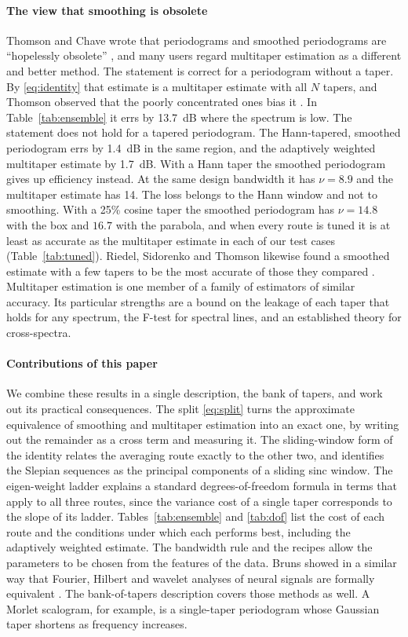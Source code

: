 \documentclass[10pt,twocolumn]{article}
\begin{document}
\paragraph{The view that smoothing is obsolete} Thomson and Chave wrote that periodograms and smoothed periodograms are ``hopelessly obsolete'' \cite{thomson1991}, and many users regard multitaper estimation as a different and better method. The statement is correct for a periodogram without a taper. By \eqref{eq:identity} that estimate is a multitaper estimate with all $N$ tapers, and Thomson observed that the poorly concentrated ones bias it \cite{thomson1982}. In Table~\ref{tab:ensemble} it errs by 13.7~dB where the spectrum is low. The statement does not hold for a tapered periodogram. The Hann-tapered, smoothed periodogram errs by 1.4~dB in the same region, and the adaptively weighted multitaper estimate by 1.7~dB. With a Hann taper the smoothed periodogram gives up efficiency instead. At the same design bandwidth it has $\nu=8.9$ and the multitaper estimate has 14. The loss belongs to the Hann window and not to smoothing. With a 25\% cosine taper the smoothed periodogram has $\nu=14.8$ with the box and $16.7$ with the parabola, and when every route is tuned it is at least as accurate as the multitaper estimate in each of our test cases (Table~\ref{tab:tuned}). Riedel, Sidorenko and Thomson likewise found a smoothed estimate with a few tapers to be the most accurate of those they compared \cite{riedel1994}. Multitaper estimation is one member of a family of estimators of similar accuracy. Its particular strengths are a bound on the leakage of each taper that holds for any spectrum, the F-test for spectral lines, and an established theory for cross-spectra.

\paragraph{Contributions of this paper} We combine these results in a single description, the bank of tapers, and work out its practical consequences. The split \eqref{eq:split} turns the approximate equivalence of smoothing and multitaper estimation into an exact one, by writing out the remainder as a cross term and measuring it. The sliding-window form of the identity relates the averaging route exactly to the other two, and identifies the Slepian sequences as the principal components of a sliding sinc window. The eigen-weight ladder explains a standard degrees-of-freedom formula in terms that apply to all three routes, since the variance cost of a single taper corresponds to the slope of its ladder. Tables~\ref{tab:ensemble} and \ref{tab:dof} list the cost of each route and the conditions under which each performs best, including the adaptively weighted estimate. The bandwidth rule and the recipes allow the parameters to be chosen from the features of the data. Bruns showed in a similar way that Fourier, Hilbert and wavelet analyses of neural signals are formally equivalent \cite{bruns2004}. The bank-of-tapers description covers those methods as well. A Morlet scalogram, for example, is a single-taper periodogram whose Gaussian taper shortens as frequency increases.
\end{document}
